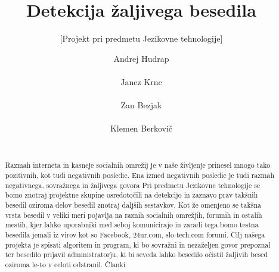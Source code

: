 \documentclass{acm_proc_article-sp}
\begin{document}
\title{Detekcija žaljivega besedila}
\subtitle{[Projekt pri predmetu Jezikovne tehnologije]}


\author{
\alignauthor 
Andrej Hudrap\\
       \\
\alignauthor 
Janez Krnc\\
       \\
\alignauthor 
Zan Bezjak\\
       \\
\alignauthor 
Klemen Berkovič\\
       \\
}

\maketitle

\begin{abstract}
Razmah interneta in kasneje socialnih omrežij je v naše življenje prinesel mnogo tako pozitivnih, kot tudi negativnih posledic.
Ena izmed negativnih posledic je tudi razmah negativnega, sovražnega in žaljivega govora
Pri predmetu Jezikovne tehnologije se bomo znotraj projektne skupine osredotočili na detekcijo in zaznavo prav takšnih besedil oziroma delov besedil znotraj daljših sestavkov.
Kot že omenjeno se takšna vrsta besedil v veliki meri pojavlja na raznih socialnih omrežjih, forumih in ostalih mestih, kjer lahko uporabniki med seboj komunicirajo in zaradi tega bomo testna besedila jemali iz virov kot so Facebook, 24ur.com, slo-tech.com forumi.
Cilj našega projekta je spisati algoritem in program, ki bo sovražni in nezaželjen govor prepoznal ter besedilo prijavil administratorju, ki bi seveda lahko besedilo očistil žaljivih besed oziroma le-to v celoti odstranil.
Članki~\cite{Burnap2016, Chen:2012:DOL:2411131.2411739, POI3:POI385}
\end{abstract}



 
\end{document}
